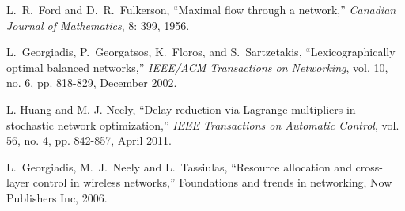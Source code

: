 \documentclass{sig-alternate-2013}
\begin{document}
\begin{thebibliography}{99}
L.~R.~Ford and D.~R.~Fulkerson, ``Maximal flow through a network,'' \emph{Canadian Journal of Mathematics}, 8: 399, 1956.

 L.~Georgiadis, P.~Georgatsos, K.~Floros, and S.~Sartzetakis, ``Lexicographically optimal balanced networks,'' \emph{IEEE/ACM Transactions on Networking}, vol.
10, no. 6, pp. 818-829, December 2002.

 L. Huang and M. J. Neely, ``Delay reduction via Lagrange multipliers in stochastic network optimization,'' \emph{IEEE Transactions on Automatic Control}, vol. 56, no. 4, pp. 842-857, April 2011.

 L.~Georgiadis, M.~J.~Neely and L.~Tassiulas, ``Resource allocation and cross-layer control in wireless networks,'' 
Foundations and trends in networking, Now Publishers Inc, 2006.



\end{thebibliography}



\appendix
\end{document}
